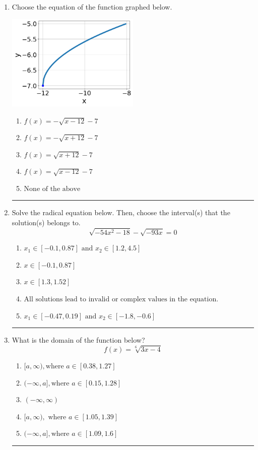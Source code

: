\documentclass[14pt]{extbook}
\newcommand{\litem}[1]{\item#1\hspace*{-1cm}\rule{\textwidth}{0.4pt}}
\begin{document}
\begin{enumerate}
{\begin{enumerate}[label=\Alph*.]
\end{enumerate} }
\litem{
Choose the equation of the function graphed below.
\begin{center}
    \includegraphics[width=0.5\textwidth]{../Figures/radicalGraphToEquationCopyA.png}
\end{center}
\begin{enumerate}[label=\Alph*.]
\item \( f(x) = - \sqrt{x - 12} - 7 \)
\item \( f(x) = - \sqrt{x + 12} - 7 \)
\item \( f(x) = \sqrt{x + 12} - 7 \)
\item \( f(x) = \sqrt{x - 12} - 7 \)
\item \( \text{None of the above} \)

\end{enumerate} }
\litem{
Solve the radical equation below. Then, choose the interval(s) that the solution(s) belongs to.\[ \sqrt{-54 x^2 - 18} - \sqrt{-93 x} = 0 \]\begin{enumerate}[label=\Alph*.]
\item \( x_1 \in [-0.1, 0.87] \text{ and } x_2 \in [1.2,4.5] \)
\item \( x \in [-0.1,0.87] \)
\item \( x \in [1.3,1.52] \)
\item \( \text{All solutions lead to invalid or complex values in the equation.} \)
\item \( x_1 \in [-0.47, 0.19] \text{ and } x_2 \in [-1.8,-0.6] \)

\end{enumerate} }
\litem{
What is the domain of the function below?\[ f(x) = \sqrt[6]{3 x - 4} \]\begin{enumerate}[label=\Alph*.]
\item \( [a, \infty), \text{where } a \in [0.38, 1.27] \)
\item \( (-\infty, a], \text{where } a \in [0.15, 1.28] \)
\item \( (-\infty, \infty) \)
\item \( [a, \infty), \text{ where } a \in [1.05, 1.39] \)
\item \( (-\infty, a], \text{where } a \in [1.09, 1.6] \)


\end{enumerate}}
\end{enumerate}
\end{document}
